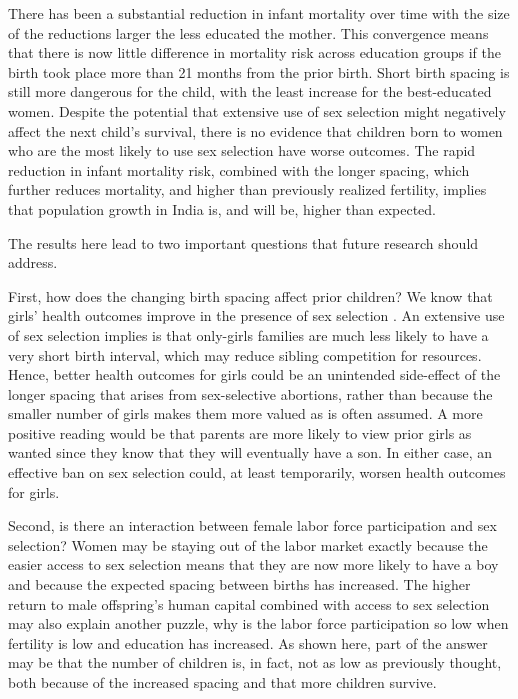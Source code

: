 \documentclass[12pt,letterpaper]{article}
\begin{document}
There has been a substantial reduction in infant mortality over time with the size of
the reductions larger the less educated the mother.
This convergence means that there is now little difference in mortality risk across
education groups if the birth took place more than 21 months from the prior birth.
Short birth spacing is still more dangerous for the child, with the least increase for
the best-educated women.
Despite the potential that extensive use of sex selection might negatively affect the 
next child's survival, there is no evidence that children born to women who are the most
likely to use sex selection have worse outcomes. 
The rapid reduction in infant mortality risk, combined with the longer spacing,
which further reduces mortality, and higher than previously realized fertility, 
implies that population growth in India is, and will be, higher than expected.



The results here lead to two important questions that future research should address.

First, how does the changing birth spacing affect prior children?
We know that girls' health outcomes improve in the presence of sex selection 
\citep{Lin2014,Hu2015}.
An extensive use of sex selection implies is that only-girls families are much less 
likely to have a very short birth interval, which may reduce sibling competition for 
resources.
Hence, better health outcomes for girls could be an unintended side-effect 
of the longer spacing that arises from sex-selective abortions, rather than because the 
smaller number of girls makes them more valued as is often assumed.
A more positive reading would be that parents are more likely to view prior girls as
wanted since they know that they will eventually have a son.
In either case, an effective ban on sex selection could, at least temporarily, worsen
health outcomes for girls.

Second, is there an interaction between female labor force participation and 
sex selection?
Women may be staying out of the labor market exactly because the easier access to sex 
selection means that they are now more likely to have a boy and because the expected 
spacing between births has increased.
The higher return to male offspring's human capital combined with access to sex
selection may also explain another puzzle, why is the labor force participation so
low when fertility is low and education has increased.
As shown here, part of the answer may be that the number of children is, in fact, not as 
low as previously thought, both because of the increased spacing and that more 
children survive.
\end{document}
